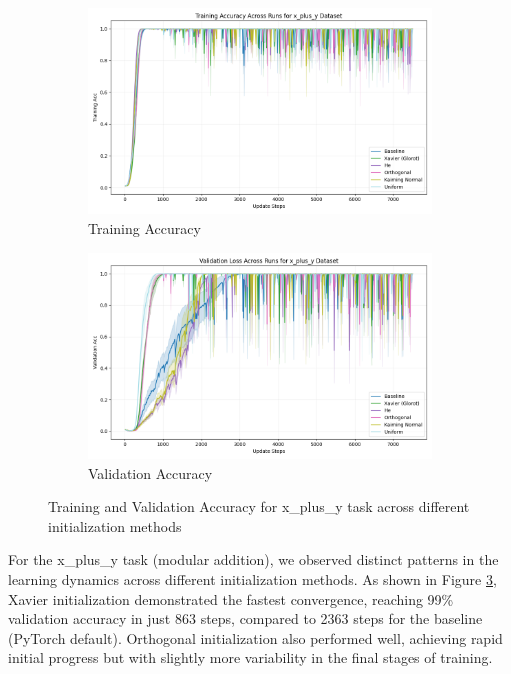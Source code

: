 \documentclass{article} %
\begin{document}
\begin{figure}[h]
    \centering
    \begin{subfigure}{0.49\textwidth}
        \includegraphics[width=\textwidth]{train_acc_x_plus_y.png}
        \caption{Training Accuracy}
        \label{fig:train_acc_x_plus_y}
    \end{subfigure}
    \hfill
    \begin{subfigure}{0.49\textwidth}
        \includegraphics[width=\textwidth]{val_acc_x_plus_y.png}
        \caption{Validation Accuracy}
        \label{fig:val_acc_x_plus_y}
    \end{subfigure}
    \caption{Training and Validation Accuracy for x\_plus\_y task across different initialization methods}
    \label{fig:acc_x_plus_y}
\end{figure}

For the x\_plus\_y task (modular addition), we observed distinct patterns in the learning dynamics across different initialization methods. As shown in Figure \ref{fig:acc_x_plus_y}, Xavier initialization demonstrated the fastest convergence, reaching 99\% validation accuracy in just 863 steps, compared to 2363 steps for the baseline (PyTorch default). Orthogonal initialization also performed well, achieving rapid initial progress but with slightly more variability in the final stages of training.
\end{document}
